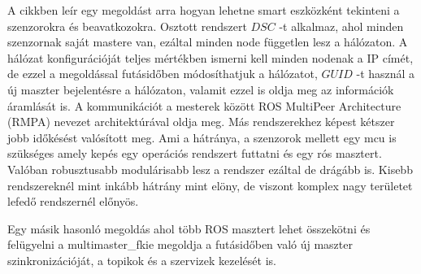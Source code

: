 A  \cite{DistributedRealTimeControlROS} cikkben leír egy megoldást arra hogyan lehetne smart eszközként tekinteni a szenzorokra és beavatkozokra. Osztott rendszert $DSC$ -t alkalmaz, ahol minden szenzornak saját mastere van, ezáltal minden node független lesz a hálózaton. A hálózat konfigurációját teljes mértékben ismerni kell minden nodenak a IP címét, de ezzel a megoldással futásidőben módosíthatjuk a hálózatot, $GUID$ -t használ a új maszter bejelentésre a hálózaton, valamit ezzel is oldja meg az információk áramlását is.
A kommunikációt a mesterek között ROS MultiPeer Architecture (RMPA) nevezet architektúrával oldja meg. Más rendszerekhez képest kétszer jobb időkésést valósított meg. 
Ami a hátránya, a szenzorok mellett egy mcu is szükséges amely kepés egy operációs rendszert futtatni és egy rós masztert. Valóban robusztusabb modulárisabb lesz a rendszer ezáltal de drágább is. Kisebb rendszereknél mint inkább hátrány mint elöny, de viszont komplex nagy területet lefedő rendszernél előnyös.

Egy másik hasonló megoldás ahol több ROS masztert lehet összekötni és felügyelni a multimaster\_fkie megoldja a futásidőben való új maszter szinkronizációját, a topikok és a szervizek kezelését is. 




